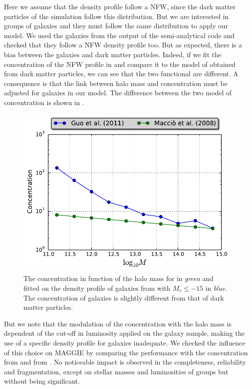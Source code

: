 Here we assume that the density profile follow a NFW, since the dark matter
particles of the \citet{Borgani+04} simulation follow this distribution. But we
are interested in groups of galaxies and they must follow the same distribution
to apply our model. We used the galaxies from the output of the \citet{Guo+11}
semi-analytical code and checked that they follow a NFW density profile too.
But as expected, there is a bias between the galaxies and dark matter
particles. Indeed, if we fit the concentration of the NFW profile in
\citet{Guo+11} and compare it to the model of \citet{Maccio+08} obtained from
dark matter particles, we can see that the two functional are different. A
consequence is that the link between halo mass and concentration must be
adjusted for galaxies in our model. The difference between the two model of
concentration is shown in .
%
\begin{figure}[ht]
    \centering
    \includegraphics[width=0.8\linewidth]{figures/maggie/concentrations.pdf}
    \caption{The concentration in function of the halo mass for
        \citet{Maccio+08} in \emph{green} and fitted on the \citet{NFW+97}
        density profile of galaxies from \citet{Guo+11} with $M_r\leqslant-15$
        in \emph{blue}. The concentration of galaxies is slightly different
    from that of dark matter particles.\label{fig:concentration_bias}}
\end{figure}
%
But we note that the modulation of the concentration with the halo mass is
dependent of the cut-off in luminosity applied on the galaxy sample, making the
use of a specific density profile for galaxies inadequate. We checked the
influence of this choice on MAGGIE by comparing the performance with the
concentration from \citet{Guo+11} and from \citet{Maccio+08}. No noticeable
impact is observed in the completeness, reliability and fragmentation, except
on stellar masses and luminosities of groups but without being significant.

